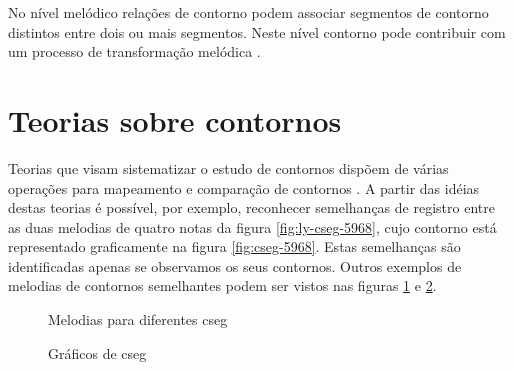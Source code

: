No nível melódico relações de contorno podem associar segmentos de
contorno distintos entre dois ou mais segmentos. Neste nível contorno
pode contribuir com um processo de transformação melódica
\cite[p. 159]{clifford95:contour}.

\section{Teorias sobre contornos}
\label{sec:teor-sobre-cont}



Teorias que visam sistematizar o estudo de contornos dispõem de várias
operações para mapeamento e comparação de contornos
\cite{friedmann85:methodology,friedmann87:response,morris87:composition,morris93:directions,marvin.ea87:relating,clifford95:contour,polansky.ea92:possible,quinn97:fuzzy,beard03:contour}
.  A partir das idéias destas teorias é
possível, por exemplo, reconhecer semelhanças de registro entre as
duas melodias de quatro notas da figura \ref{fig:ly-cseg-5968}, cujo
contorno está representado graficamente na figura
\ref{fig:cseg-5968}. Estas semelhanças são identificadas apenas se
observamos os seus contornos. Outros exemplos de melodias de contornos
semelhantes podem ser vistos nas figuras \ref{fig:melodias-cseg} e
\ref{fig:graficos-cseg}.

\begin{figure}
  \centering

  \caption{Melodias para diferentes cseg}
  \label{fig:melodias-cseg}
\end{figure}

\begin{figure}
  \centering
  \subfloat[cseg P(5 9 6 8)]{
    \texttt{[image: c-5968]}
    \label{fig:cseg-5968}
  }
  \subfloat[cseg Q(5 7 6 8)]{
    \texttt{[image: c-5768]}
    \label{fig:cseg-5768}
  }
  \subfloat[cseg R(3 0 5 1)]{
    \texttt{[image: c-3051]}

    \label{fig:cseg-3051}
  }
  \caption{Gráficos de cseg}
  \label{fig:graficos-cseg}
\end{figure}

